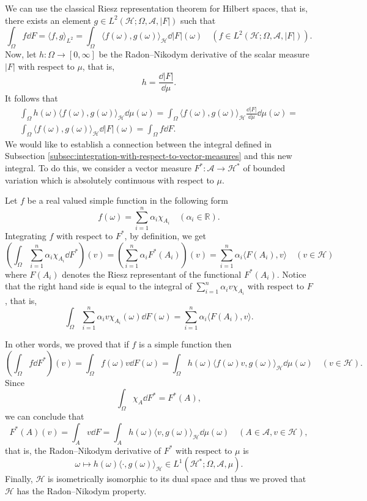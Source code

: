 \documentclass[a4paper, 12pt]{article}
\begin{document}
We can use the classical Riesz representation theorem for Hilbert spaces, that is, there exists an element $g \in L^2(\mathcal{H}; \Omega, \mathcal{A}, |F|)$ such that
$$ \int_{\Omega} f \dd{F} = \langle f, g \rangle_{L^2} = \int_{\Omega} \langle f(\omega), g(\omega) \rangle_{\mathcal{H}} \dd{|F|(\omega)} \quad (f \in L^2(\mathcal{H}; \Omega, \mathcal{A}, |F|)).$$
Now, let $h: \Omega \to [0, \infty]$ be the Radon\---Nikodym derivative of the scalar measure $|F|$ with respect to $\mu$, that is,
$$h = \frac{\dd{|F|}}{\dd{\mu}}.$$
It follows that
\begin{equation*}
\begin{split}
\int_{\Omega} h(\omega)\langle f(\omega), g(\omega) \rangle_{\mathcal{H}} \dd{\mu(\omega)} = \int_{\Omega}  \langle f(\omega), g(\omega) \rangle_{\mathcal{H}} \frac{\dd{|F|}}{\dd{\mu}} \dd{\mu(\omega)} = \\ \int_{\Omega} \langle f(\omega), g(\omega) \rangle_{\mathcal{H}} \dd{|F|(\omega)} = \int_{\Omega} f \dd{F}.
\end{split}
\end{equation*}
We would like to establish a connection between the integral defined in Subsection \ref{subsec:integration-with-respect-to-vector-measures} and this new integral. To do this, we consider a vector measure $F^* \colon \mathcal{A} \to \mathcal{H}^*$ of bounded variation which is absolutely continuous with respect to $\mu$. 

Let $f$ be a real valued simple function in the following form
$$f(\omega) = \sum^{n}_{i=1} \alpha_i \chi_{A_i} \quad (\alpha_i \in \mathbb{R}).$$
Integrating $f$ with respect to $F^*$, by definition, we get
$$\left(\int_{\Omega} \sum^{n}_{i=1} \alpha_i \chi_{A_i} \dd{F^*}\right)(v) = \left(\sum^{n}_{i=1} \alpha_i F^*(A_i)\right)(v) = \sum^{n}_{i=1} \alpha_i \langle F(A_i), v \rangle \quad (v \in \mathcal{H})$$
where $F(A_i)$ denotes the Riesz representant of the functional $F^*(A_i)$. Notice that the right hand side is equal to
the integral of $\sum^{n}_{i=1} \alpha_i v \chi_{A_i}$ with respect to $F$, that is,
$$\int_{\Omega} \sum^{n}_{i=1} \alpha_i v \chi_{A_i}(\omega) \dd{F(\omega)} = \sum^{n}_{i=1} \alpha_i  \langle F(A_i), v \rangle.$$

In other words, we proved that if $f$ is a simple function then
$$\left(\int_{\Omega} f \dd{F^*}\right)(v) = \int_{\Omega} f(\omega)v \dd{F(\omega)} = \int_{\Omega} h(\omega)\langle f(\omega)v, g(\omega) \rangle_{\mathcal{H}} \dd{\mu(\omega)} \quad (v \in \mathcal{H}).$$
Since
$$\int_{\Omega} \chi_A \dd{F^*} = F^*(A),$$
we can conclude that
$$F^*(A)(v) = \int_{A} v \dd{F} = \int_{A} h(\omega)\langle v, g(\omega) \rangle_{\mathcal{H}} \dd{\mu(\omega)} \quad (A \in \mathcal{A}, v \in \mathcal{H}),$$
that is, the Radon\---Nikodym derivative of $F^*$ with respect to $\mu$ is
$$\omega \mapsto h(\omega)\langle \cdot , g(\omega) \rangle_{\mathcal{H}} \in L^1(\mathcal{H^*}; \Omega, \mathcal{A}, \mu).$$
Finally, $\mathcal{H}$ is isometrically isomorphic to its dual space and thus we proved that $\mathcal{H}$ has the Radon\---Nikodym property.
\end{document}
